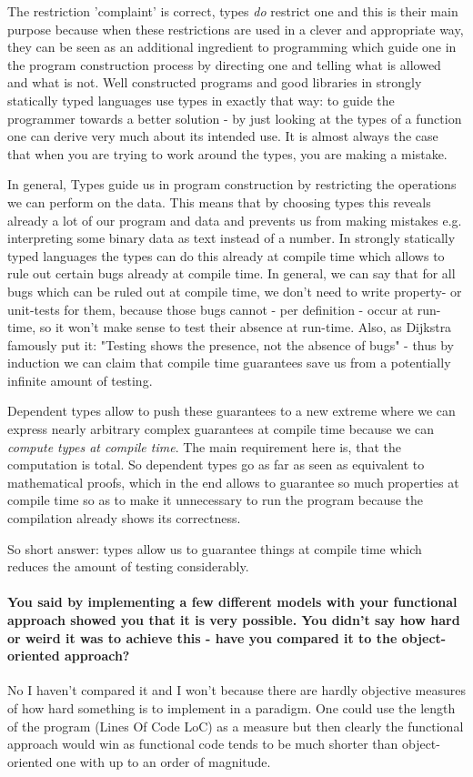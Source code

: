 The restriction 'complaint' is correct, types \textit{do} restrict one and this is their main purpose because when these restrictions are used in a clever and appropriate way, they can be seen as an additional ingredient to programming which guide one in the program construction process by directing one and telling what is allowed and what is not. Well constructed programs and good libraries in strongly statically typed languages use types in exactly that way: to guide the programmer towards a better solution - by just looking at the types of a function one can derive very much about its intended use. It is almost always the case that when you are trying to work around the types, you are making a mistake.

In general, Types guide us in program construction by restricting the operations we can perform on the data. This means that by choosing types this reveals already a lot of our program and data and prevents us from making mistakes e.g. interpreting some binary data as text instead of a number. In strongly statically typed languages the types can do this already at compile time which allows to rule out certain bugs already at compile time. In general, we can say that for all bugs which can be ruled out at compile time, we don't need to write property- or unit-tests for them, because those bugs cannot - per definition - occur at run-time, so it won't make sense to test their absence at run-time. Also, as Dijkstra famously put it: "Testing shows the presence, not the absence of bugs" - thus by induction we can claim that compile time guarantees save us from a potentially infinite amount of testing.

Dependent types allow to push these guarantees to a new extreme where we can express nearly arbitrary complex guarantees at compile time because we can \textit{compute types at compile time}. The main requirement here is, that the computation is total. So dependent types go as far as seen as equivalent to mathematical proofs, which in the end allows to guarantee so much properties at compile time so as to make it unnecessary to run the program because the compilation already shows its correctness.

So short answer: types allow us to guarantee things at compile time which reduces the amount of testing considerably.

\paragraph{You said by implementing a few different models with your functional approach showed you that it is very possible. You didn't say how hard or weird it was to achieve this - have you compared it to the object-oriented approach?}
No I haven't compared it and I won't because there are hardly objective measures of how hard something is to implement in a paradigm. One could use the length of the program (Lines Of Code LoC) as a measure but then clearly the functional approach would win as functional code tends to be much shorter than object-oriented one with up to an order of magnitude.

